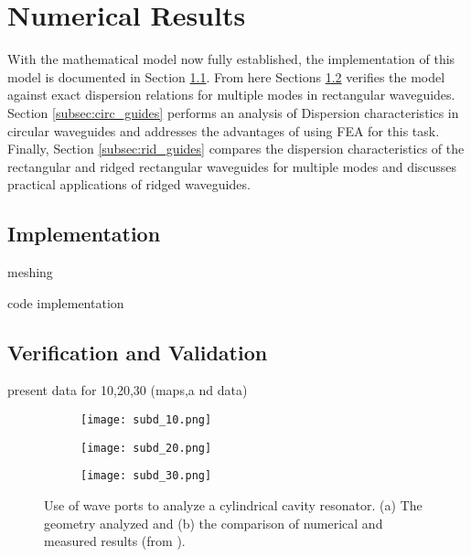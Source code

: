\section{Numerical Results}
\label{sec:numres}
With the mathematical model now fully established, the implementation of this model is documented in Section \ref{subsec:impl}. From here Sections \ref{subsec:vv} verifies the model against exact dispersion relations for multiple modes in rectangular waveguides. Section \ref{subsec:circ_guides} performs an analysis of Dispersion characteristics in circular waveguides and addresses the advantages of using FEA for this task. Finally, Section \ref{subsec:rid_guides} compares the dispersion characteristics of the rectangular and ridged rectangular waveguides for multiple modes and discusses practical applications of ridged waveguides.

\subsection{Implementation}
\label{subsec:impl}
meshing

code implementation

\subsection{Verification and Validation}
\label{subsec:vv}

present data for 10,20,30 (maps,a nd data)
\begin{figure}[t!]
	\begin{subfigure}{\linewidth} %
		\centering
		\texttt{[image: subd\_10.png]} %
		\caption{}
		\label{subfig:waveport1}
	\end{subfigure}
	\begin{subfigure}{\linewidth}
		\centering
		\texttt{[image: subd\_20.png]} %
		\caption{} %
		\label{subfig:waveport2}
	\end{subfigure}
	\begin{subfigure}{\linewidth}
		\centering
		\texttt{[image: subd\_30.png]} %
		\caption{} %
		\label{subfig:waveport2}
	\end{subfigure}
	\caption{Use of wave ports to analyze a cylindrical cavity resonator. (a) The geometry analyzed and (b) the comparison of numerical and measured results (from \cite{jin2011theory}).}
	\label{fig:charge_d}
\end{figure}

